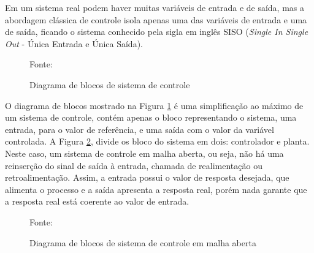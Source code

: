 Em um sistema real podem haver muitas variáveis de entrada e de saída, 
mas a abordagem clássica de controle isola apenas uma das 
variáveis de entrada e uma de saída, 
ficando o sistema conhecido pela sigla em inglês 
SISO (\emph{Single In Single Out} - Única Entrada e Única Saída).
%


\begin{figure}[!htb]
\centering
\caption{ Diagrama de blocos de sistema de controle}
\label{fig:processo}

{\small Fonte: \cite{Ogata} }
\end{figure}


O diagrama de blocos mostrado na Figura \ref{fig:processo} é uma simplificação ao máximo de um sistema de controle, contém apenas o bloco representando o sistema, uma entrada, para o valor de referência, e uma saída com o valor da variável controlada. A Figura \ref{fig:malhaAberta}, divide os bloco do sistema em dois: controlador e planta. Neste caso, um sistema de controle em malha aberta, ou seja, não há uma reinserção do sinal de saída à entrada, chamada de realimentação ou retroalimentação. Assim, a entrada possui o valor de resposta desejada, que alimenta o processo e a saída apresenta a resposta real, porém nada garante que a resposta real está coerente ao valor de entrada.

\begin{figure}[!htb]
\centering
\caption{ Diagrama de blocos de sistema de controle em malha aberta}
\label{fig:malhaAberta}

{\small Fonte: \cite{Ogata}}
\end{figure}

